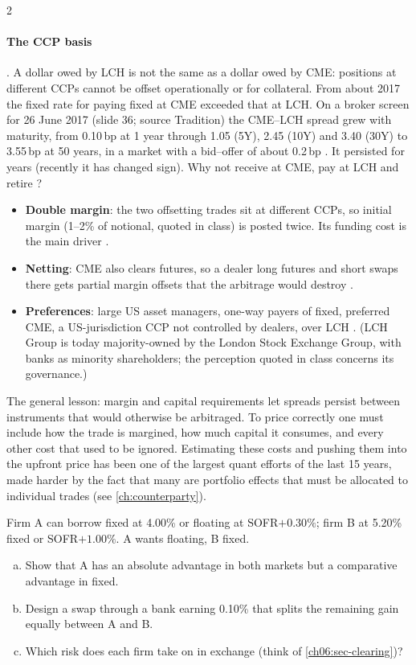 \begin{paracol}{2}
\paragraph{The CCP basis} . A dollar owed by LCH is not the same as a dollar owed by CME:
positions at different CCPs cannot be offset operationally or for collateral. From about 2017 the fixed rate for
paying fixed at CME exceeded that at LCH. On a broker screen for 26 June 2017 (slide 36; source Tradition) the
CME--LCH spread grew with maturity, from 0.10\,bp at 1 year through 1.05 (5Y), 2.45 (10Y) and 3.40 (30Y) to
3.55\,bp at 50 years, in a market with a bid--offer of about 0.2\,bp . It persisted for years
(recently it has changed sign). Why not receive at CME, pay at LCH and retire ?
\begin{itemize}
  \item \textbf{Double margin}: the two offsetting trades sit at different CCPs, so initial margin (1--2\% of
        notional, quoted in class) is posted twice. Its funding cost is the main driver
        .
  \item \textbf{Netting}: CME also clears futures, so a dealer long futures and short swaps there gets partial
        margin offsets that the arbitrage would destroy .
  \item \textbf{Preferences}: large US asset managers, one-way payers of fixed, preferred CME, a US-jurisdiction
        CCP not controlled by dealers, over LCH . (LCH Group is today majority-owned by the
        London Stock Exchange Group, with banks as minority shareholders; the perception quoted in class concerns
        its governance.)
\end{itemize}
The general lesson: margin and capital requirements let spreads persist between instruments that would otherwise
be arbitraged. To price correctly one must include how the trade is margined, how much capital it consumes, and
every other cost that used to be ignored. Estimating these costs and pushing them into the upfront price has been
one of the largest quant efforts of the last 15 years, made harder by the fact that many are portfolio effects
that must be allocated to individual trades  (see \cref{ch:counterparty}).

\begin{exercise}\label{ch06:ex-compadv}
Firm A can borrow fixed at 4.00\% or floating at SOFR$+0.30\%$;
firm B at 5.20\% fixed or SOFR$+1.00\%$. A wants floating, B fixed.
\begin{enumerate}[(a)]
  \item Show that A has an absolute advantage in both markets but a
      comparative advantage in fixed.
  \item Design a swap through a bank earning 0.10\% that splits the
      remaining gain equally between A and B.
  \item Which risk does each firm take on in exchange (think of
      \cref{ch06:sec-clearing})?
\end{enumerate}
\end{exercise}
\par\medskip


\end{paracol}
